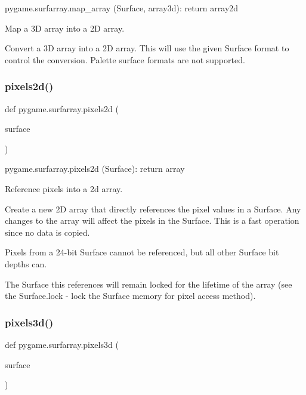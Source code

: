 \begin{DoxyVerb}pygame.surfarray.map_array (Surface, array3d): return array2d

Map a 3D array into a 2D array.

Convert a 3D array into a 2D array. This will use the given Surface
format to control the conversion. Palette surface formats are not
supported.
\end{DoxyVerb}
 \mbox{\label{namespacepygame_1_1surfarray_af496a129c691b2afc2b7d431efcd121c}} 
\subsubsection{\texorpdfstring{pixels2d()}{pixels2d()}}
{\footnotesize\ttfamily def pygame.\+surfarray.\+pixels2d (\begin{DoxyParamCaption}\item[{}]{surface }\end{DoxyParamCaption})}

\begin{DoxyVerb}pygame.surfarray.pixels2d (Surface): return array

Reference pixels into a 2d array.

Create a new 2D array that directly references the pixel values in a
Surface. Any changes to the array will affect the pixels in the
Surface. This is a fast operation since no data is copied.

Pixels from a 24-bit Surface cannot be referenced, but all other
Surface bit depths can.

The Surface this references will remain locked for the lifetime of
the array (see the Surface.lock - lock the Surface memory for pixel
access method).
\end{DoxyVerb}
 \mbox{\label{namespacepygame_1_1surfarray_afa77b220881cc8c872ad7e38fe3419e8}} 
\subsubsection{\texorpdfstring{pixels3d()}{pixels3d()}}
{\footnotesize\ttfamily def pygame.\+surfarray.\+pixels3d (\begin{DoxyParamCaption}\item[{}]{surface }\end{DoxyParamCaption})}

